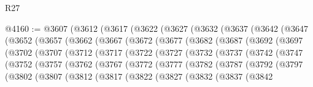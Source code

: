 \begin{lexlean}{R27}
\begin{coremodule}
@4160 := @3607
    (@3612
      (@3617
        (@3622
          (@3627
            (@3632
              (@3637
                (@3642
                  (@3647
                    (@3652
                      (@3657
                        (@3662
                          (@3667
                            (@3672
                              (@3677
                                (@3682
                                  (@3687
                                    (@3692
                                      (@3697
                                        (@3702
                                          (@3707
                                            (@3712
                                              (@3717
                                                (@3722
                                                  (@3727
                                                    (@3732
                                                      (@3737
                                                        (@3742
                                                          (@3747
                                                            (@3752
                                                              (@3757
                                                                (@3762
                                                                  (@3767
                                                                    (@3772
                                                                      (@3777
                                                                        (@3782
                                                                          (@3787
                                                                            (@3792
                                                                              (@3797
                                                                                (@3802
                                                                                  (@3807
                                                                                    (@3812
                                                                                      (@3817
                                                                                        (@3822
                                                                                          (@3827
                                                                                            (@3832
                                                                                              (@3837
                                                                                                (@3842

\end{coremodule}
\end{lexlean}
